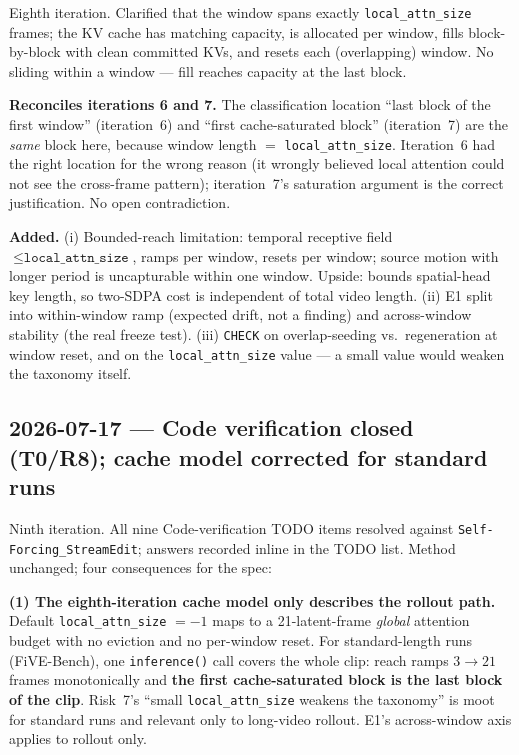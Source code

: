 \documentclass{article}
\begin{document}
Eighth iteration. Clarified that the window spans exactly
\texttt{local\_attn\_size} frames; the KV cache has matching capacity, is
allocated per window, fills block-by-block with clean committed KVs, and resets
each (overlapping) window. No sliding within a window --- fill reaches capacity
at the last block.

\textbf{Reconciles iterations 6 and 7.} The classification location ``last block
of the first window'' (iteration~6) and ``first cache-saturated block''
(iteration~7) are the \emph{same} block here, because window length $=$
\texttt{local\_attn\_size}. Iteration~6 had the right location for the wrong
reason (it wrongly believed local attention could not see the cross-frame
pattern); iteration~7's saturation argument is the correct justification. No open
contradiction.

\textbf{Added.} (i) Bounded-reach limitation: temporal receptive field $\le
\texttt{local\_attn\_size}$, ramps per window, resets per window; source motion
with longer period is uncapturable within one window. Upside: bounds spatial-head
key length, so two-SDPA cost is independent of total video length. (ii) E1 split
into within-window ramp (expected drift, not a finding) and across-window
stability (the real freeze test). (iii) \texttt{CHECK} on overlap-seeding vs.\
regeneration at window reset, and on the \texttt{local\_attn\_size} value ---
a small value would weaken the taxonomy itself.

\subsection*{2026-07-17 --- Code verification closed (T0/R8); cache model corrected for standard runs}

Ninth iteration. All nine Code-verification TODO items resolved against
\texttt{Self-Forcing\_StreamEdit}; answers recorded inline in the TODO list.
Method unchanged; four consequences for the spec:

\textbf{(1) The eighth-iteration cache model only describes the rollout path.}
Default \texttt{local\_attn\_size} $= -1$ maps to a 21-latent-frame
\emph{global} attention budget with no eviction and no per-window reset.
For standard-length runs (FiVE-Bench), one \texttt{inference()} call covers the
whole clip: reach ramps $3 \to 21$ frames monotonically and \textbf{the first
cache-saturated block is the last block of the clip}. Risk~7's ``small
\texttt{local\_attn\_size} weakens the taxonomy'' is moot for standard runs and
relevant only to long-video rollout. E1's across-window axis applies to rollout
only.
\end{document}
